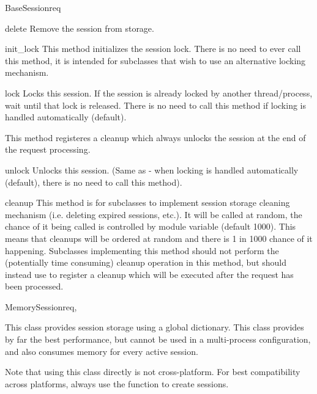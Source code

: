 \begin{classdesc}{BaseSession}{req}
  \begin{methoddesc}[BaseSession]{delete}{}
    Remove the session from storage.
  \end{methoddesc}

  \begin{methoddesc}[BaseSession]{init_lock}{}
    This method initializes the session lock. There is no need to ever
    call this method, it is intended for subclasses that wish to use
    an alternative locking mechanism.
  \end{methoddesc}

  \begin{methoddesc}[BaseSession]{lock}{}
    Locks this session. If the session is already locked by another
    thread/process, wait until that lock is released. There is no need
    to call this method if locking is handled automatically (default).

    This method registeres a cleanup which always unlocks the session
    at the end of the request processing.
  \end{methoddesc}

  \begin{methoddesc}[BaseSession]{unlock}{}
    Unlocks this session. (Same as  - when locking is
    handled automatically (default), there is no need to call this
    method).
  \end{methoddesc}

  \begin{methoddesc}[BaseSession]{cleanup}{}
    This method is for subclasses to implement session storage
    cleaning mechanism (i.e. deleting expired sessions, etc.). It will
    be called at random, the chance of it being called is controlled
    by   module variable
    (default 1000). This means that cleanups will be ordered at random
    and there is 1 in 1000 chance of it happening. Subclasses
    implementing this method should not perform the (potentially time
    consuming) cleanup operation in this method, but should instead
    use  to register a cleanup which will
    be executed after the request has been processed.
  \end{methoddesc}

\end{classdesc}

\begin{classdesc}{MemorySession}{req, }

  This class provides session storage using a global dictionary. This
  class provides by far the best performance, but cannot be used in a
  multi-process configuration, and also consumes memory for every
  active session.

  Note that using this class directly is not cross-platform. For best
  compatibility across platforms, always use the 
  function to create sessions.

\end{classdesc}

